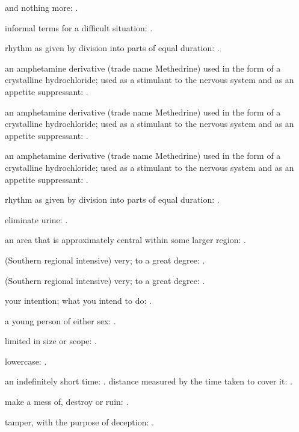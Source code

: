   and nothing more: .

  informal terms for a difficult situation: .

  rhythm as given by division into parts of equal duration: .

  an amphetamine derivative (trade name Methedrine) used in the form of a crystalline hydrochloride; used as a stimulant to the nervous system and as an appetite suppressant: .

  an amphetamine derivative (trade name Methedrine) used in the form of a crystalline hydrochloride; used as a stimulant to the nervous system and as an appetite suppressant: .

  an amphetamine derivative (trade name Methedrine) used in the form of a crystalline hydrochloride; used as a stimulant to the nervous system and as an appetite suppressant: .

  rhythm as given by division into parts of equal duration: .

  eliminate urine: .

  an area that is approximately central within some larger region: .

  (Southern regional intensive) very; to a great degree: .

  (Southern regional intensive) very; to a great degree: .

  your intention; what you intend to do: .

  a young person of either sex: .

  limited in size or scope: .

  lowercase: .

  an indefinitely short time: . distance measured by the time taken to cover it: .

  make a mess of, destroy or ruin: .

  tamper, with the purpose of deception: .

